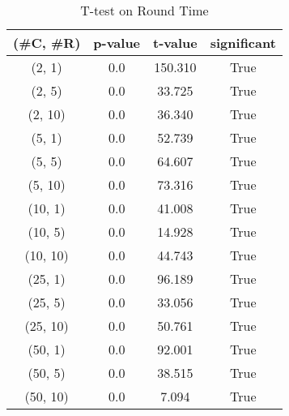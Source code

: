 \begin{table}[h]
\centering
\caption{T-test on Round Time}
\label{tab:t-testRound}
\begin{tabular}{|c|c|c|c|}
\toprule
(\#C, \#R) &  p-value &  t-value &  significant \\
\midrule
  (2, 1) &      0.0 &  150.310 &         True \\
  (2, 5) &      0.0 &   33.725 &         True \\
 (2, 10) &      0.0 &   36.340 &         True \\
  (5, 1) &      0.0 &   52.739 &         True \\
  (5, 5) &      0.0 &   64.607 &         True \\
 (5, 10) &      0.0 &   73.316 &         True \\
 (10, 1) &      0.0 &   41.008 &         True \\
 (10, 5) &      0.0 &   14.928 &         True \\
(10, 10) &      0.0 &   44.743 &         True \\
 (25, 1) &      0.0 &   96.189 &         True \\
 (25, 5) &      0.0 &   33.056 &         True \\
(25, 10) &      0.0 &   50.761 &         True \\
 (50, 1) &      0.0 &   92.001 &         True \\
 (50, 5) &      0.0 &   38.515 &         True \\
(50, 10) &      0.0 &    7.094 &         True \\
\bottomrule
\end{tabular}
\end{table}
